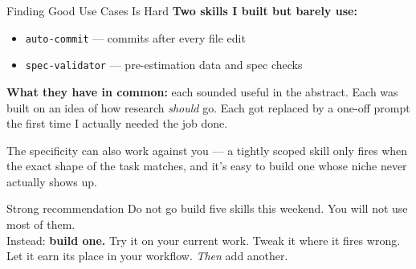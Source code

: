 \documentclass[aspectratio=169, 11pt]{beamer}
\begin{document}
\begin{frame}{Finding Good Use Cases Is Hard}
  \textbf{Two skills I built but barely use:}

  \vspace{0.3em}
  \begin{itemize}
    \item \texttt{auto-commit} --- commits after every file edit
    \item \texttt{spec-validator} --- pre-estimation data and spec checks
  \end{itemize}

  \vspace{0.5em}
  \textbf{What they have in common:} each sounded useful in the abstract. Each was built on an idea of how research \emph{should} go. Each got replaced by a one-off prompt the first time I actually needed the job done.

  \vspace{0.4em}
  The specificity can also work against you --- a tightly scoped skill only fires when the exact shape of the task matches, and it's easy to build one whose niche never actually shows up.

  \vspace{0.5em}
  \begin{alertblock}{Strong recommendation}
    Do not go build five skills this weekend. You will not use most of them.\\[0.3em]
    Instead: \textbf{build one.} Try it on your current work. Tweak it where it fires wrong. Let it earn its place in your workflow. \emph{Then} add another.
  \end{alertblock}
\end{frame}
\end{document}

